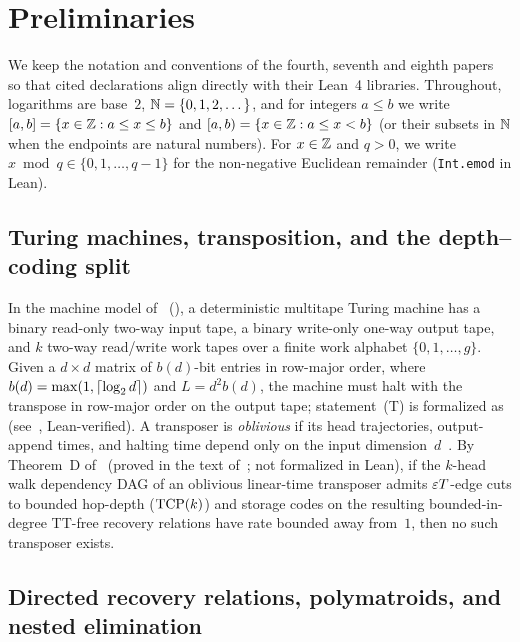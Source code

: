 \section{Preliminaries}\label{sec:prelim}

We keep the notation and conventions of the fourth, seventh and eighth papers~\cite{FourthPaper2026,SeventhPaper2026,EighthPaper2026}
so that cited declarations align directly with their Lean~4 libraries. Throughout, logarithms are base~$2$, $\mathbb{N} = \{0,1,2,\dots\}$,
and for integers $a \le b$ we write $[a, b] = \{x \in \mathbb{Z} : a \le x \le b\}$ and $[a, b) = \{x \in \mathbb{Z} : a \le x < b\}$ (or
their subsets in $\mathbb{N}$ when the endpoints are natural numbers). For $x \in \mathbb{Z}$ and $q > 0$, we write $x \bmod q \in
\{0, 1, \dots, q-1\}$ for the non-negative Euclidean remainder (\texttt{Int.emod} in Lean).

\subsection{Turing machines, transposition, and the depth--coding split}

In the machine model of~\cite{FirstPaper2026,FourthPaper2026} (), a deterministic multitape Turing
machine has a binary read-only two-way input tape, a binary write-only one-way output tape, and $k$ two-way read/write
work tapes over a finite work alphabet $\{0, 1, \dots, g\}$. Given a $d \times d$ matrix of $b(d)$-bit entries in
row-major order, where $b(d) = \max(1, \lceil \log_2 d \rceil)$ and $L = d^2 b(d)$, the machine must halt with the transpose in
row-major order on the output tape; statement~(T) is formalized as 
(see~\cite[Section~2]{FirstPaper2026}, Lean-verified). A transposer is \emph{oblivious} if its head trajectories,
output-append times, and halting time depend only on the input dimension~$d$~\cite[Section~2]{FirstPaper2026}. By
Theorem~D of~\cite[Section~4.2, Theorem~4.10]{FourthPaper2026} (proved in the text of~\cite{FourthPaper2026}; not
formalized in Lean), if the $k$-head walk dependency DAG of an oblivious linear-time transposer admits $\varepsilon T$-edge cuts
to bounded hop-depth ($\mathrm{TCP}(k)$) and storage codes on the resulting bounded-in-degree TT-free recovery relations have rate
bounded away from~$1$, then no such transposer exists.

\subsection{Directed recovery relations, polymatroids, and nested elimination}

